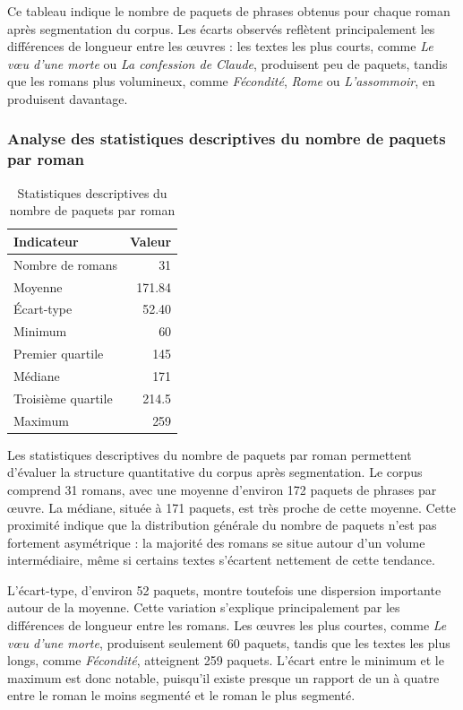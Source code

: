 Ce tableau indique le nombre de paquets de phrases obtenus pour chaque roman après segmentation du corpus. Les écarts observés reflètent principalement les différences de longueur entre les œuvres : les textes les plus courts, comme \textit{Le vœu d'une morte} ou \textit{La confession de Claude}, produisent peu de paquets, tandis que les romans plus volumineux, comme \textit{Fécondité}, \textit{Rome} ou \textit{L'assommoir}, en produisent davantage.

\subsubsection{Analyse des statistiques descriptives du nombre de paquets par roman}
\begin{table}[H]
\centering
\caption{Statistiques descriptives du nombre de paquets par roman}
\begin{tabular}{lr}
\toprule
\textbf{Indicateur} & \textbf{Valeur} \\
\midrule
Nombre de romans & 31 \\
Moyenne & 171.84 \\
Écart-type & 52.40 \\
Minimum & 60 \\
Premier quartile & 145 \\
Médiane & 171 \\
Troisième quartile & 214.5 \\
Maximum & 259 \\
\bottomrule
\end{tabular}
\end{table}


Les statistiques descriptives du nombre de paquets par roman permettent d'évaluer la structure quantitative du corpus après segmentation. Le corpus comprend 31 romans, avec une moyenne d'environ 172 paquets de phrases par œuvre. La médiane, située à 171 paquets, est très proche de cette moyenne. Cette proximité indique que la distribution générale du nombre de paquets n'est pas fortement asymétrique : la majorité des romans se situe autour d'un volume intermédiaire, même si certains textes s'écartent nettement de cette tendance.

L'écart-type, d'environ 52 paquets, montre toutefois une dispersion importante autour de la moyenne. Cette variation s'explique principalement par les différences de longueur entre les romans. Les œuvres les plus courtes, comme \textit{Le vœu d'une morte}, produisent seulement 60 paquets, tandis que les textes les plus longs, comme \textit{Fécondité}, atteignent 259 paquets. L'écart entre le minimum et le maximum est donc notable, puisqu'il existe presque un rapport de un à quatre entre le roman le moins segmenté et le roman le plus segmenté.


